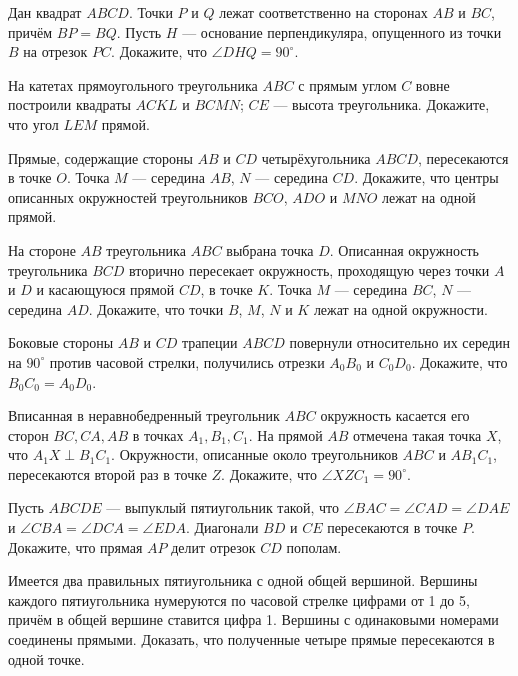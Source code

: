 \documentclass{article}
\begin{document}
    \begin{enumerate_boxed}

        \item Дан квадрат $ABCD$.
        Точки $P$ и $Q$ лежат соответственно на сторонах $AB$ и $BC$, причём $BP =BQ$.
        Пусть $H$ — основание перпендикуляра, опущенного из точки $B$ на отрезок $PC$.
        Докажите, что $\angle DHQ = 90^\circ$.

        \item На катетах прямоугольного треугольника $ABC$ с прямым углом $C$ вовне построили квадраты $ACKL$ и $BCMN$; $CE$ — высота треугольника.
        Докажите, что угол $LEM$ прямой.

        \item Прямые, содержащие стороны $AB$ и $CD$ четырёхугольника $ABCD$, пересекаются в точке $O$.
        Точка $M$ — середина $AB$, $N$ — середина $CD$.
        Докажите, что центры описанных окружностей треугольников $BCO$, $ADO$ и $MNO$ лежат на одной прямой.

        \item На стороне $AB$ треугольника $ABC$ выбрана точка $D$.
        Описанная окружность треугольника $BCD$ вторично пересекает окружность, проходящую через точки $A$ и $D$ и касающуюся прямой $CD$, в точке $K$.
        Точка $M$ — середина $BC$, $N$ — середина $AD$.
        Докажите, что точки $B$, $M$, $N$ и $K$ лежат на одной окружности.

        \item Боковые стороны $AB$ и $CD$ трапеции $ABCD$ повернули относительно их середин на $90^\circ$ против часовой стрелки, получились отрезки $A_{0}B_0$ и $C_{0}D_0$.
        Докажите, что $B_{0}C_0=A_{0}D_0$.

        \item Вписанная в неравнобедренный треугольник $ABC$ окружность касается его сторон $BC, CA, AB$ в точках $A_1, B_1, C_1$.
        На прямой $AB$ отмечена такая точка $X$, что $A_{1}X \perp B_{1}C_1$.
        Окружности, описанные около треугольников $ABC$ и $AB_{1}C_1$, пересекаются второй раз в точке $Z$.
        Докажите, что $\angle XZC_1=90^\circ$.

        \item  Пусть $ABCDE$ — выпуклый пятиугольник такой, что
        $\angle BAC=\angle CAD=\angle DAE$ и $\angle CBA=\angle DCA=\angle EDA$.
        Диагонали $BD$ и $CE$ пересекаются в точке $P$.
        Докажите, что прямая $AP$ делит отрезок $CD$ пополам.

        \item Имеется два правильных пятиугольника с одной общей вершиной.
        Вершины каждого пятиугольника нумеруются по часовой стрелке цифрами от 1 до 5, причём в общей вершине ставится цифра 1.
        Вершины с одинаковыми номерами соединены прямыми.
        Доказать, что полученные четыре прямые пересекаются в одной точке.


\end{enumerate_boxed}
\end{document}
